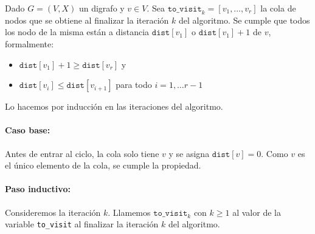 \begin{lema}
  Dado \(G=(V,X)\) un digrafo y \(v\in V\). Sea \(\texttt{to\_visit}_k=[v_1,\dots,v_r]\) la cola de nodos que se obtiene al finalizar la iteración \(k\) del algoritmo. Se cumple que todos los nodo de la misma están a distancia \(\texttt{dist}[v_1]\) o \( \texttt{dist}[v_1]+ 1\) de \(v\), formalmente:
  \begin{itemize}
    \item \(\texttt{dist}[v_1] + 1 \geq \texttt{dist}[v_r]\) y
    \item \(\texttt{dist}[v_i] \leq \texttt{dist}[v_{i+1}]\) para todo \(i = 1,\dots r-1\)
  \end{itemize}
\end{lema}
\begin{demo}
  Lo hacemos por inducción en las iteraciones del algoritmo.
  \paragraph{Caso base:} Antes de entrar al ciclo, la cola solo tiene \(v\) y se asigna \(\texttt{dist}[v] = 0 \). Como \(v\) es el único elemento de la cola, se cumple la propiedad.


  \paragraph{Paso inductivo:} Consideremos la iteración \(k\). Llamemos \(\texttt{to\_visit}_k\) con \(k \geq 1\) al valor de la variable \texttt{to\_visit} al finalizar la iteración \(k\) del algoritmo.
\end{demo}
